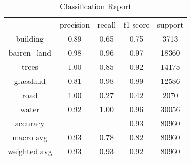
\begin{center}
    \begin{table}
	\begin{tabular}{ c c c c c}
		& precision & recall & f1-score & support \\
    building    &   0.89 &     0.65  &    0.75   &   3713 \\
barren\_land     &  0.98  &    0.96   &   0.97  &   18360 \\
      trees      & 1.00  &    0.85   &   0.92  &   14175 \\
 grassland      & 0.81  &    0.98   &   0.89   &  12586 \\
      road      & 1.00  &    0.27    &  0.42  &    2070 \\
     water      & 0.92  &    1.00   &   0.96   &  30056 \\

  accuracy       &  ---      &   ---   &      0.93   &  80960 \\
 macro avg      & 0.93    &  0.78 &     0.82  &   80960 \\
weighted avg      & 0.93 &     0.93     & 0.92   &  80960 \\



	\end{tabular}
	\caption{Classification Report}
    \label{Classification Report}
	\end{table}
\end{center}
